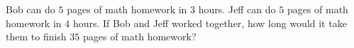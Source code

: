 Bob can do $5$ pages of math homework in $3$ hours. Jeff can do $5$ pages of math homework in $4$ hours. If Bob and Jeff worked together, how long would it take them to finish $35$ pages of math homework?
